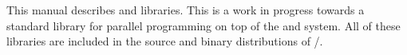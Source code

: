 This manual describes \charmpp{} and \converse{} libraries.
This is a work in progress towards a standard library for parallel
programming on top of the \converse{} and \charmpp{} system.
All of these libraries are included in the source and binary distributions
of \charmpp{}/\converse{}.

